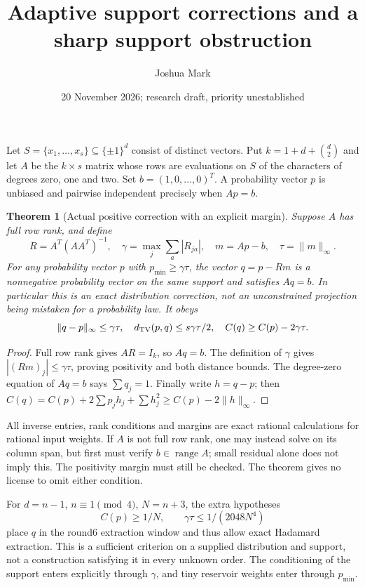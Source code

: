 \documentclass[11pt]{article}
\title{Adaptive support corrections and a sharp support obstruction}
\author{Joshua Mark}
\date{20 November 2026; research draft, priority unestablished}
\newtheorem{theorem}{Theorem}
\begin{document}
\maketitle
Let $S=\{x_1,\ldots,x_s\}\subseteq\{\pm1\}^d$ consist of distinct
vectors. Put $k=1+d+\binom d2$ and let $A$ be the $k\times s$ matrix
whose rows are evaluations on $S$ of the characters of degrees zero,
one and two. Set $b=(1,0,\ldots,0)^T$. A probability vector $p$ is
unbiased and pairwise independent precisely when $Ap=b$.

\begin{theorem}[Actual positive correction with an explicit margin]
Suppose $A$ has full row rank, and define
\[
 R=A^T(AA^T)^{-1},\quad
 \gamma=\max_j\sum_a|R_{ja}|,\quad
 m=Ap-b,\quad \tau=\|m\|_\infty.
\]
For any probability vector $p$ with $p_{\min}\ge\gamma\tau$, the
vector $q=p-Rm$ is a nonnegative probability vector on the same
support and satisfies $Aq=b$. In particular this is an exact
distribution correction, not an unconstrained projection being
mistaken for a probability law. It obeys
\[
 \|q-p\|_\infty\le\gamma\tau,\quad
 d_{\rm TV}(p,q)\le s\gamma\tau/2,\quad
 C(q)\ge C(p)-2\gamma\tau.
\]
\end{theorem}
\begin{proof}
Full row rank gives $AR=I_k$, so $Aq=b$. The definition of $\gamma$
gives $|(Rm)_j|\le\gamma\tau$, proving positivity and both distance
bounds. The degree-zero equation of $Aq=b$ says $\sum q_j=1$.
Finally write $h=q-p$; then
$C(q)=C(p)+2\sum p_jh_j+\sum h_j^2\ge C(p)-2\|h\|_\infty$.
\end{proof}
All inverse entries, rank conditions and margins are exact rational
calculations for rational input weights. If $A$ is not full row rank,
one may instead solve on its column span, but first must verify
$b\in\operatorname{range}A$; small residual alone does not imply this.
The positivity margin must still be checked. The theorem gives no
license to omit either condition.

For $d=n-1$, $n\equiv1\pmod4$, $N=n+3$, the extra hypotheses
\[
 C(p)\ge1/N,\qquad \gamma\tau\le1/(2048N^4)
\]
place $q$ in the round6 extraction window and thus allow exact
Hadamard extraction. This is a sufficient criterion on a supplied
distribution and support, not a construction satisfying it in every
unknown order. The conditioning of the support enters explicitly
through $\gamma$, and tiny reservoir weights enter through $p_{\min}$.
\end{document}

